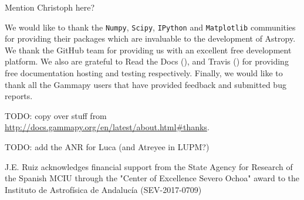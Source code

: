\begin{acknowledgements}

	Mention Christoph here?

	We would like to thank the \texttt{Numpy}, \texttt{Scipy}, \texttt{IPython} and
	\texttt{Matplotlib} communities for providing their packages which are
	invaluable to the development of Astropy. We thank the GitHub team for
	providing us with an excellent free development platform. We also are grateful
	to Read the Docs (\ReadthedocsUrl), and Travis (\TravisUrl) for providing free
	documentation hosting and testing respectively. Finally, we would like to thank
	all the Gammapy users that have provided feedback and submitted bug reports.

	TODO: copy over stuff from
	\url{http://docs.gammapy.org/en/latest/about.html#thanks}. 
	
	TODO: add the ANR for Luca (and Atreyee in LUPM?)

	J.E. Ruiz acknowledges financial support from the State Agency for Research of the Spanish MCIU through the "Center of Excellence Severo Ochoa" award to the Instituto de Astrof\'isica de Andaluc\'ia (SEV-2017-0709)

\end{acknowledgements}
